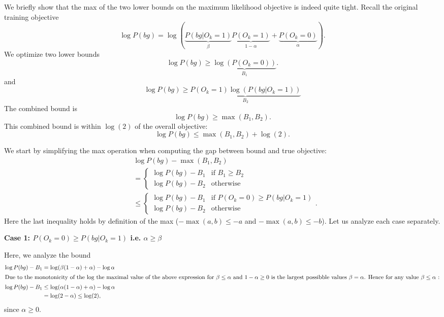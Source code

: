 \documentclass{article}
\renewcommand{\paragraph}[1]{\noindent\textbf{#1}}
\begin{document}
We briefly show that the max of the two lower bounds on the maximum likelihood objective is  indeed quite tight.
Recall the original training objective
\begin{equation*}
  \log P(bg) = \log \left(\underbrace{P(bg|O_k\!=\!1)}_\beta \underbrace{P(O_k\!=\!1)}_{1-\alpha} + \underbrace{P(O_k\!=\!0)}_{\alpha}\right).
\end{equation*}
We optimize two lower bounds
\begin{equation}
  \log P(bg) \ge \underbrace{\log \left(P(O_k\!=\!0)\right)}_{B_1}.
\end{equation}
and
\begin{equation}
  \log P(bg) \ge \underbrace{P(O_k\!=\!1) \log \left(P(bg|O_k\!=\!1)\right)}_{B_2}
\end{equation}
The combined bound is
\begin{equation}
  \log P(bg) \ge \max(B_1, B_2).
\end{equation}
This combined bound is within $\log(2)$ of the overall objective:
\begin{equation*}
  \log P(bg) \le \max(B_1, B_2) + \log(2).
\end{equation*}

We start by simplifying the max operation when computing the gap between bound and true objective:
\begin{align*}
  &\log P(bg) - \max(B_1, B_2)\\
  &=\begin{cases}\log P(bg) - B_1 & \text{if }B_1 \ge B_2\\\log P(bg) - B_2 & \text{otherwise}\end{cases}\\&\le \begin{cases}\log P(bg) - B_1 & \text{if }P(O_k=0) \ge P(bg|O_k=1)\\\log P(bg) - B_2 & \text{otherwise}\end{cases}.
\end{align*}
Here the last inequality holds by definition of the max ($-\max(a,b) \le -a$ and $-\max(a,b) \le -b$).
Let us analyze each case separately.


\paragraph{Case 1: $P(O_k=0) \ge P(bg|O_k=1)$ i.e. $\alpha \ge \beta$}

Here, we analyze the bound
\begin{align*}
  \log P(bg) - B_1 &= \log(\beta(1-\alpha)+\alpha) - \log \alpha\\
  \intertext{Due to the monotonicity of the $\log$ the maximal value of the above expression for $\beta \le \alpha$ and $1-\alpha \ge 0$ is the largest possibble values $\beta=\alpha$. Hence for any value $\beta \le \alpha$ :}
  \log P(bg) - B_1 &\le \log(\alpha(1-\alpha)+\alpha) - \log \alpha\\
  &= \log(2-\alpha) \le \log(2),\\
\end{align*}
since $\alpha \ge 0$.
\end{document}
